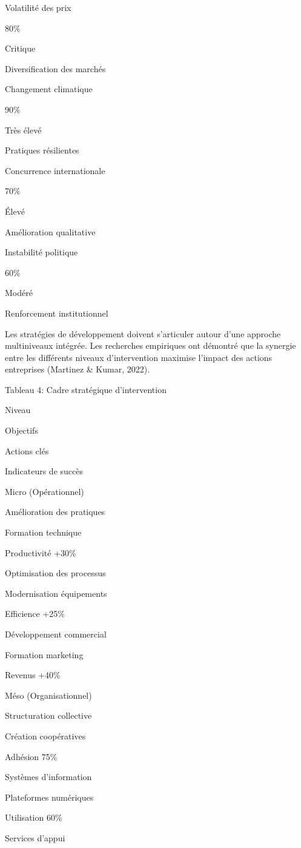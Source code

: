 \documentclass[12pt,oneside]{report}
\begin{document}
Volatilité des prix

80\%

Critique

Diversification des marchés

Changement climatique

90\%

Très élevé

Pratiques résilientes

Concurrence internationale

70\%

Élevé

Amélioration qualitative

Instabilité politique

60\%

Modéré

Renforcement institutionnel

Les stratégies de développement doivent s'articuler autour d'une approche multiniveaux intégrée. Les recherches empiriques ont démontré que la synergie entre les différents niveaux d'intervention maximise l'impact des actions entreprises (Martinez \& Kumar, 2022).

Tableau 4: Cadre stratégique d'intervention

Niveau

Objectifs

Actions clés

Indicateurs de succès

Micro (Opérationnel)

Amélioration des pratiques

Formation technique

Productivité +30\%

Optimisation des processus

Modernisation équipements

Efficience +25\%

Développement commercial

Formation marketing

Revenus +40\%

Méso (Organisationnel)

Structuration collective

Création coopératives

Adhésion 75\%

Systèmes d'information

Plateformes numériques

Utilisation 60\%

Services d'appui
\end{document}
